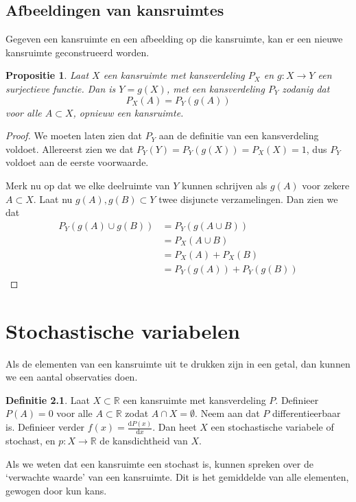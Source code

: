 \documentclass[a4paper]{book}
\newtheorem{proposition}[theorem]{Propositie}
\theoremstyle{definition}
\newtheorem{definition}[theorem]{Definitie}
\begin{document}
\section{Afbeeldingen van kansruimtes}
Gegeven een kansruimte en een afbeelding op die kansruimte, kan er een nieuwe kansruimte geconstrueerd worden.

\begin{proposition}
    Laat $X$ een kansruimte met kansverdeling $P_X$ en $g: X \to Y$ een surjectieve functie.
    Dan is $Y = g(X)$, met een kansverdeling $P_Y$ zodanig dat
    \[ P_X(A) = P_Y(g(A)) \]
    voor alle $A \subset X$, opnieuw een kansruimte.
\end{proposition}
\begin{proof}
    We moeten laten zien dat $P_Y$ aan de definitie van een kansverdeling voldoet.
    Allereerst zien we dat $P_Y(Y) = P_Y(g(X)) = P_X(X) = 1$, dus $P_Y$ voldoet aan de eerste voorwaarde.

    Merk nu op dat we elke deelruimte van $Y$ kunnen schrijven als $g(A)$ voor zekere $A \subset X$.
    Laat nu $g(A),g(B) \subset Y$ twee disjuncte verzamelingen.
    Dan zien we dat
    \begin{align*}
        P_Y(g(A) \cup g(B)) &= P_Y(g(A \cup B)) \\
                            &= P_X(A \cup B) \\
                            &= P_X(A) + P_X(B) \\
                            &= P_Y(g(A)) + P_Y(g(B))
    \end{align*}
\end{proof}


\chapter{Stochastische variabelen}
Als de elementen van een kansruimte uit te drukken zijn in een getal, dan kunnen we een aantal observaties doen.

\begin{definition}
    Laat $X \subset \mathbb{R}$ een kansruimte met kansverdeling $P$.
    Definieer $P(A) = 0$ voor alle $A \subset \mathbb{R}$ zodat $A \cap X = \emptyset$.
    Neem aan dat $P$ differentieerbaar is.
    Definieer verder $f(x) = \frac{\mathrm{d}P(x)}{\mathrm{d}x}$.
    Dan heet $X$ een stochastische variabele of stochast, en $p: X \to \mathbb{R}$ de kansdichtheid van $X$.
\end{definition}

Als we weten dat een kansruimte een stochast is, kunnen spreken over de `verwachte waarde' van een kansruimte.
Dit is het gemiddelde van alle elementen, gewogen door kun kans.
\end{document}
